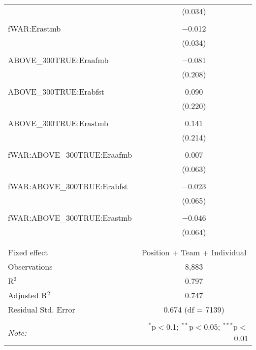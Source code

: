 \begin{table}[!htbp]
\begin{tabular}{@{\extracolsep{5pt}}lc}
  & (0.034) \\
  & \\
 fWAR:Erastmb & $-$0.012 \\
  & (0.034) \\
  & \\
 ABOVE\_300TRUE:Eraafmb & $-$0.081 \\
  & (0.208) \\
  & \\
 ABOVE\_300TRUE:Erabfst & 0.090 \\
  & (0.220) \\
  & \\
 ABOVE\_300TRUE:Erastmb & 0.141 \\
  & (0.214) \\
  & \\
 fWAR:ABOVE\_300TRUE:Eraafmb & 0.007 \\
  & (0.063) \\
  & \\
 fWAR:ABOVE\_300TRUE:Erabfst & $-$0.023 \\
  & (0.065) \\
  & \\
 fWAR:ABOVE\_300TRUE:Erastmb & $-$0.046 \\
  & (0.064) \\
  & \\
\hline \\[-1.8ex]
Fixed effect & Position + Team + Individual \\
Observations & 8,883 \\
R$^{2}$ & 0.797 \\
Adjusted R$^{2}$ & 0.747 \\
Residual Std. Error & 0.674 (df = 7139) \\
\hline
\hline \\[-1.8ex]
\textit{Note:}  & \multicolumn{1}{r}{$^{*}$p$<$0.1; $^{**}$p$<$0.05; $^{***}$p$<$0.01} \\
\end{tabular}
\end{table}
